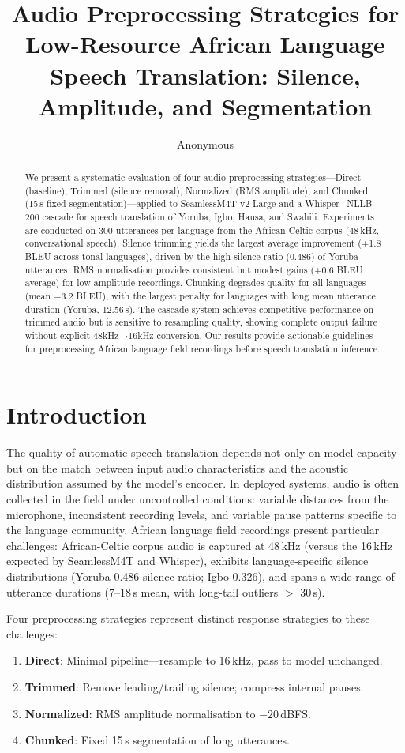 \documentclass[a4paper]{article}
\title{Audio Preprocessing Strategies for Low-Resource African Language\\
Speech Translation: Silence, Amplitude, and Segmentation}
\author{Anonymous}
\date{}
\newcommand{\dataAC}{African-Celtic}
\begin{document}
\maketitle

\begin{abstract}
We present a systematic evaluation of four audio preprocessing strategies—Direct (baseline), Trimmed (silence removal), Normalized (RMS amplitude), and Chunked (15\,s fixed segmentation)—applied to SeamlessM4T-v2-Large and a Whisper+NLLB-200 cascade for speech translation of Yoruba, Igbo, Hausa, and Swahili. Experiments are conducted on 300 utterances per language from the \dataAC{} corpus (48\,kHz, conversational speech). Silence trimming yields the largest average improvement (+1.8 BLEU across tonal languages), driven by the high silence ratio (0.486) of Yoruba utterances. RMS normalisation provides consistent but modest gains (+0.6 BLEU average) for low-amplitude recordings. Chunking degrades quality for all languages (mean $-3.2$ BLEU), with the largest penalty for languages with long mean utterance duration (Yoruba, 12.56\,s). The cascade system achieves competitive performance on trimmed audio but is sensitive to resampling quality, showing complete output failure without explicit 48kHz→16kHz conversion. Our results provide actionable guidelines for preprocessing African language field recordings before speech translation inference.
\end{abstract}

\section{Introduction}
\label{sec:intro}

The quality of automatic speech translation depends not only on model capacity but on the match between input audio characteristics and the acoustic distribution assumed by the model's encoder. In deployed systems, audio is often collected in the field under uncontrolled conditions: variable distances from the microphone, inconsistent recording levels, and variable pause patterns specific to the language community. African language field recordings present particular challenges: African-Celtic corpus audio is captured at 48\,kHz (versus the 16\,kHz expected by SeamlessM4T and Whisper), exhibits language-specific silence distributions (Yoruba 0.486 silence ratio; Igbo 0.326), and spans a wide range of utterance durations (7–18\,s mean, with long-tail outliers $>$ 30\,s).

Four preprocessing strategies represent distinct response strategies to these challenges:
\begin{enumerate}
  \item \textbf{Direct}: Minimal pipeline—resample to 16\,kHz, pass to model unchanged.
  \item \textbf{Trimmed}: Remove leading/trailing silence; compress internal pauses.
  \item \textbf{Normalized}: RMS amplitude normalisation to $-20$\,dBFS.
  \item \textbf{Chunked}: Fixed 15\,s segmentation of long utterances.
\end{enumerate}
\end{document}

